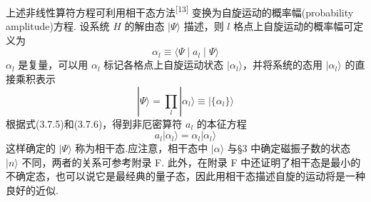 上述非线性算符方程可利用相干态方法\textsuperscript{[13]}
变换为自旋运动的概率幅(probability amplitude)方程.
设系统 $H$ 的解由态 $|\Psi\rangle$ 描述，则 $l$
格点上自旋运动的概率幅可定义为
\begin{equation}
  \alpha_l\equiv\langle\Psi\mid a_l\mid\Psi\rangle
\end{equation}
$\alpha_l$
是复量，可以用 $\alpha_l$
标记各格点上自旋运动状态 $|\alpha_l\rangle$，并将系统的态用 $|\alpha_l\rangle$ 的直接乘积表示
\begin{equation}
  |\Psi\rangle=\prod_l|\alpha_l\rangle\equiv|\{\alpha_l\}\rangle
\end{equation}
根据式(3.7.5)和(3.7.6)，得到非厄密算符 $a_l$ 的本征方程
\begin{equation}
  a_l|\alpha_l\rangle=\alpha_l|\alpha_l\rangle
\end{equation}
这样确定的 $|\Psi\rangle$
称为相干态.应注意，相干态中 $|\alpha\rangle$
与§3 中确定磁振子数的状态 $|n\rangle$
不同，两者的关系可参考附录 F.
此外，在附录 F
中还证明了相干态是最小的不确定态，也可以说它是最经典的量子态，因此用相干态描述自旋的运动将是一种良好的近似.

